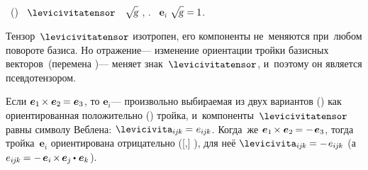 \begin{otherlanguage}{russian}
~()  ~$\levicivitatensor$
 ~\!${\sqrt{\hspace{-0.36ex}\mathstrut{\textsl{g}}}}$ , .
~${\bm{e}_i}$ 
${\hspace{-0.25ex}\sqrt{\hspace{-0.36ex}\mathstrut{\textsl{g}\hspace{.12ex}}} = \hspace{-0.1ex} 1}$.

Тензор~$\levicivitatensor$ изотропен, его компоненты не~меняются при~\hbox{любом} повороте базиса.
Но отражение\:--- изменение ориентации тройки базисных векторов~(перемена )\:---
меняет знак~$\levicivitatensor$, и~поэтому он является псевдотензором.

Если ${\bm{e}_1 \hspace{-0.2ex} \times \bm{e}_2 \hspace{-0.15ex} = \bm{e}_3}$,
то ${\bm{e}_i}$\:--- произвольно выбираемая из двух вариантов () как ориентированная положительно () \hbox{тройка},
и~компоненты~$\levicivitatensor$ равны символу Веблена:
${\levicivita_{i\hspace{-0.1ex}j\hspace{-0.1ex}k} \hspace{-0.1ex} = \hspace{.1ex} e_{i\hspace{-0.1ex}j\hspace{-0.1ex}k}}$.
Когда~же ${\bm{e}_1 \hspace{-0.2ex} \times \bm{e}_2 \hspace{-0.15ex} = - \hspace{.25ex} \bm{e}_3}$, тогда тройка~${\bm{e}_i}$ ориентирована отрицательно ([,] ),
для неё ${\levicivita_{i\hspace{-0.1ex}j\hspace{-0.1ex}k} \hspace{-0.1ex} = - \hspace{.2ex} e_{i\hspace{-0.1ex}j\hspace{-0.1ex}k}}$
(а~${e_{i\hspace{-0.1ex}j\hspace{-0.1ex}k} \hspace{-0.12ex} = - \hspace{.33ex} \bm{e}_i \hspace{-0.2ex} \times \hspace{-0.2ex} \bm{e}_j \hspace{-0.1ex} \dotp \hspace{.12ex} \bm{e}_k}$).


\end{otherlanguage}
